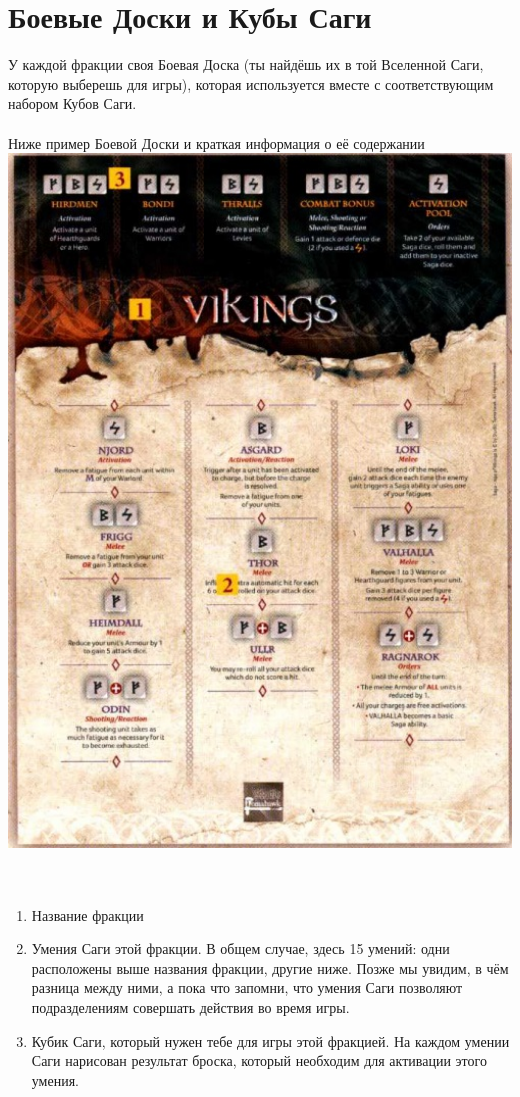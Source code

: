 \documentclass[a4paper,11pt,twoside]{article}
\begin{document}
\section*{Боевые Доски и Кубы Саги}
У каждой фракции своя Боевая Доска (ты найдёшь их в той Вселенной Саги, которую выберешь для игры), которая используется вместе с соответствующим набором Кубов Саги. \\ \\ 
Ниже пример Боевой Доски и краткая информация о её содержании
\newpage
\includegraphics[width=1.0\textwidth,]{pics/SagaBattleboard} \\ \\ \\
\begin{enumerate}
\item Название фракции
\item Умения Саги этой фракции. В общем случае, здесь 15 умений: одни расположены выше названия фракции, другие ниже. Позже мы увидим, в чём разница между ними, а пока что запомни, что умения Саги позволяют подразделениям совершать действия во время игры.
\item Кубик Саги, который нужен тебе для игры этой фракцией. На каждом умении Саги нарисован результат броска, который необходим для активации этого умения.
\end{enumerate} 
\end{document}
